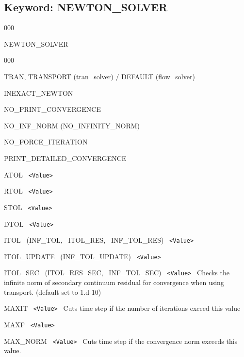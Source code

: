 \hyperlink{target_key}{\return}


\newpage
\protect\hypertarget{target_newt}{}

\subsection{Keyword: NEWTON\_SOLVER}


\begin{deflist}{000}
\item[NEWTON\_SOLVER] ~
\begin{deflist}{000}
\item[TRAN, TRANSPORT (tran\_solver) / DEFAULT (flow\_solver)]
\item[INEXACT\_NEWTON]
\item[NO\_PRINT\_CONVERGENCE]
\item[NO\_INF\_NORM (NO\_INFINITY\_NORM)]
\item[NO\_FORCE\_ITERATION]
\item[PRINT\_DETAILED\_CONVERGENCE]
\item[ATOL] \ {\tt <Value>}
\item[RTOL] \ {\tt <Value>}
\item[STOL] \ {\tt <Value>}
\item[DTOL] \ {\tt <Value>}
\item[ITOL \ (INF\_TOL, \ ITOL\_RES, \ INF\_TOL\_RES)] \ {\tt <Value>}
\item[ITOL\_UPDATE \ (INF\_TOL\_UPDATE)] \ {\tt <Value>}
\item[ITOL\_SEC \ (ITOL\_RES\_SEC, \ INF\_TOL\_SEC)] \ {\tt <Value>} \ Checks the infinite norm of secondary continuum residual for convergence when using transport. (default set to 1.d-10)
\item[MAXIT] \ {\tt <Value>} \ Cuts time step if the number of iterations exceed this value
\item[MAXF] \ {\tt <Value>}
\item[MAX\_NORM] \ {\tt <Value>} \ Cuts time step if the convergence norm exceeds this value. 
\end{deflist}
\item[\keyend]
\end{deflist}


